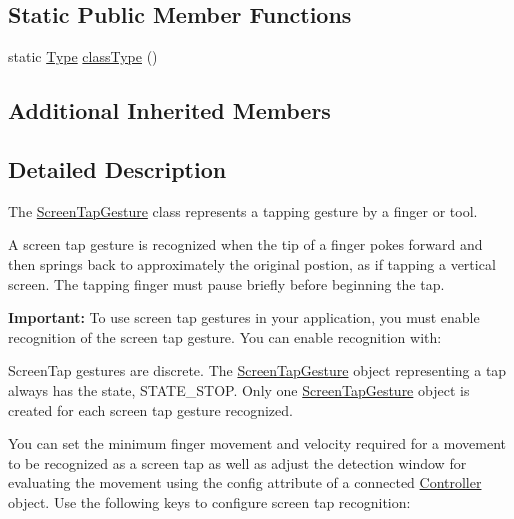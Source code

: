 \subsection*{Static Public Member Functions}
\begin{DoxyCompactItemize}
\item 
static \hyperlink{class_leap_1_1_gesture_a6fa6dd4f28c502f0d55abc6b71c6f9b1}{Type} \hyperlink{class_leap_1_1_screen_tap_gesture_ae967e0ad37fc48faa25044b4a9977f25}{class\+Type} ()
\end{DoxyCompactItemize}
\subsection*{Additional Inherited Members}


\subsection{Detailed Description}
The \hyperlink{class_leap_1_1_screen_tap_gesture}{Screen\+Tap\+Gesture} class represents a tapping gesture by a finger or tool.

A screen tap gesture is recognized when the tip of a finger pokes forward and then springs back to approximately the original postion, as if tapping a vertical screen. The tapping finger must pause briefly before beginning the tap.



{\bfseries Important\+:} To use screen tap gestures in your application, you must enable recognition of the screen tap gesture. You can enable recognition with\+:


\begin{DoxyCodeInclude}
\end{DoxyCodeInclude}


Screen\+Tap gestures are discrete. The \hyperlink{class_leap_1_1_screen_tap_gesture}{Screen\+Tap\+Gesture} object representing a tap always has the state, S\+T\+A\+T\+E\+\_\+\+S\+T\+O\+P. Only one \hyperlink{class_leap_1_1_screen_tap_gesture}{Screen\+Tap\+Gesture} object is created for each screen tap gesture recognized.

You can set the minimum finger movement and velocity required for a movement to be recognized as a screen tap as well as adjust the detection window for evaluating the movement using the config attribute of a connected \hyperlink{class_leap_1_1_controller}{Controller} object. Use the following keys to configure screen tap recognition\+:

